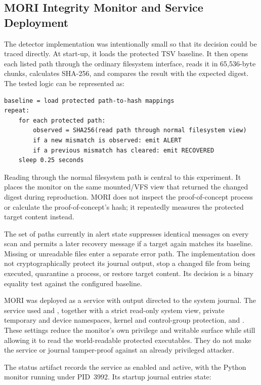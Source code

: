 \subsection{MORI Integrity Monitor and Service Deployment}

The detector implementation was intentionally small so that its decision could
be traced directly. At start-up, it loads the protected TSV baseline. It then
opens each listed path through the ordinary filesystem interface, reads it in
65,536-byte chunks, calculates SHA-256, and compares the result with the
expected digest. The tested logic can be represented as:

\begin{lstlisting}
baseline = load protected path-to-hash mappings
repeat:
    for each protected path:
        observed = SHA256(read path through normal filesystem view)
        if a new mismatch is observed: emit ALERT
        if a previous mismatch has cleared: emit RECOVERED
    sleep 0.25 seconds
\end{lstlisting}

Reading through the normal filesystem path is central to this experiment. It
places the monitor on the same mounted/VFS view that returned the changed
digest during reproduction. MORI does not inspect the proof-of-concept process
or calculate the proof-of-concept's hash; it repeatedly measures the protected
target content instead.

The set of paths currently in alert state suppresses identical messages on
every scan and permits a later recovery message if a target again matches its
baseline. Missing or unreadable files enter a separate error path. The
implementation does not cryptographically protect its journal output, stop a
changed file from being executed, quarantine a process, or restore target
content. Its decision is a binary equality test against the configured
baseline.

MORI was deployed as a  service with output directed to the
system journal. The service used  and
, together with a strict read-only system view,
private temporary and device namespaces, kernel and control-group protection,
and . These settings reduce the monitor's own
privilege and writable surface while still allowing it to read the
world-readable protected executables. They do not make the service or journal
tamper-proof against an already privileged attacker.

The status artifact records the service as enabled and active, with the Python
monitor running under PID~3992. Its startup journal entries state:

